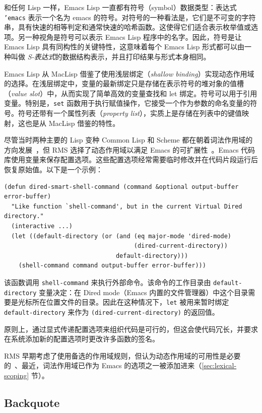 \documentclass[format=acmsmall,screen]{acmart}
\begin{document}
和任何 Lisp 一样，Emacs Lisp 一直都有符号（symbol）数据类型：表达式 \texttt{'emacs} 表示一个名为 emacs 的符号。对符号的一种看法是，它们是不可变的字符串，具有快速的相等判定和通常快速的哈希函数。这使得它们适合表示枚举值或选项。另一种视角是符号可以表示 Emacs Lisp 程序中的名字。因此，符号是让 Emacs Lisp 具有同构性的关键特性，这意味着每个 Emacs Lisp 形式都可以由一种叫做 \textit{S-表达式}的数据结构表示，并且打印结果与形式本身相同。

Emacs Lisp 从 MacLisp 借鉴了使用浅层绑定（\emph{shallow binding}）实现动态作用域的选择。在浅层绑定中，变量的最新绑定只是存储在表示符号的堆对象的值槽（\emph{value slot}）中，从而实现了简单高效的变量查找和 let 绑定。符号可以用于引用变量。特别是，\texttt{set} 函数用于执行赋值操作，它接受一个作为参数的命名变量的符号。符号还带有一个属性列表（\textit{property list}），实质上是存储在列表中的键值映射，这也是从 MacLisp 借鉴的特性。

尽管当时两种主要的 Lisp 变种 Common Lisp 和 Scheme 都在朝着词法作用域的方向发展~\cite{CLtL1,R2RS}，但 RMS 选择了动态作用域以满足 Emacs 的可扩展性~\cite{Stallman1981}。Emacs 代码库使用变量来保存配置选项。这些配置选项经常需要临时修改并在代码片段运行后恢复原始值。以下是一个示例：
%
\begin{verbatim}
(defun dired-smart-shell-command (command &optional output-buffer error-buffer)
  "Like function `shell-command', but in the current Virtual Dired directory."
  (interactive ...)
  (let ((default-directory (or (and (eq major-mode 'dired-mode)
                                    (dired-current-directory))
                               default-directory)))
    (shell-command command output-buffer error-buffer)))
\end{verbatim}
%
该函数调用 \texttt{shell-command} 来执行外部命令。该命令的工作目录由 \texttt{default-directory} 变量决定：在 Dired mode（Emacs 内置的文件管理器）中这个目录需要是光标所在位置文件的目录。因此在这种情况下，\texttt{let} 被用来暂时绑定 \texttt{default-directory} 来作为 \texttt{(dired-current-directory)} 的返回值。

原则上，通过显式传递配置选项来组织代码是可行的，但这会使代码冗长，并要求在系统添加新的配置选项时更改许多函数的签名。

RMS 早期考虑了使用备选的作用域规则，但认为动态作用域的可用性是必要的~\cite{Stallman1981}、最近，词法作用域已作为 Emacs 的选项之一被添加进来（\ref{sec:lexical-scoping} 节）。


\subsection{Backquote}
\label{sec:backquote}
\end{document}
